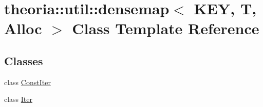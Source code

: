 \hypertarget{classtheoria_1_1util_1_1densemap}{}\section{theoria\+:\+:util\+:\+:densemap$<$ K\+EY, T, Alloc $>$ Class Template Reference}
\label{classtheoria_1_1util_1_1densemap}
\subsection*{Classes}
\begin{DoxyCompactItemize}
\item 
class \hyperlink{classtheoria_1_1util_1_1densemap_1_1ConstIter}{Const\+Iter}
\item 
class \hyperlink{classtheoria_1_1util_1_1densemap_1_1Iter}{Iter}
\end{DoxyCompactItemize}
